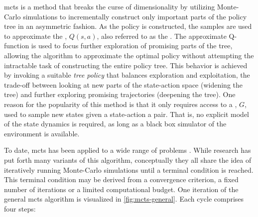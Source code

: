 \acf{mcts} is a method that breaks the curse of dimensionality by utilizing
Monte-Carlo simulations to incrementally construct only important parts of the
policy tree in an asymmetric fashion. As the policy is constructed, the samples
are used to approximate the , $Q(s, a)$,
also referred to as the . The approximate Q-function is used
to focus further exploration of promising parts of the tree, allowing the
algorithm to approximate the optimal policy without attempting the intractable
task of constructing the entire policy tree. This behavior is achieved by
invoking a suitable \emph{tree policy} that balances exploration and
exploitation, the trade-off between looking at new parts of the state-action
space (widening the tree) and further exploring promising trajectories
(deepening the tree). One reason for the popularity of this method is that
it only requires access to a , $G$, used to sample new states
given a state-action a pair. That is, no explicit model of the state dynamics is
required, as long as a black box simulator of the environment is available.

To date, \ac{mcts} has been applied to a wide range of problems
\cite{browne2012survey}. While research has put forth many variants of this
algorithm, conceptually they all share the idea of iteratively running
Monte-Carlo simulations until a terminal condition is reached. This terminal
condition may be derived from a convergence criterion, a fixed number of
iterations or a limited computational budget. One iteration of the general
\ac{mcts} algorithm is visualized in \cref{fig:mcts-general}. Each cycle
comprises four steps:

